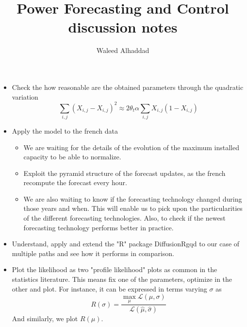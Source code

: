 \documentclass[a4paper, 12pt]{article}
\title{Power Forecasting and Control\\ discussion notes}
\author{Waleed Alhaddad }
\date{}
\begin{document}
\maketitle

\begin{itemize}
\item Check the how reasonable are the obtained parameters through the quadratic variation
\begin{equation}
\sum_{i,j} (X_{i,j} - X_{i,j})^2 \approx 2 \theta_t \alpha \sum_{i,j}  X_{i,j} (1-X_{i,j})
\end{equation}
\item Apply the model to the french data
	\begin{itemize}
	\item We are waiting for the details of the evolution of the maximum installed capacity to be able to normalize.
	\item Exploit the pyramid structure of the forecast updates, as the french 	recompute the forecast every hour.
	\item We are also waiting to know if the forecasting technology changed during those years and when. This will enable us to  pick upon the particularities of the different forecasting technologies. Also, to check if the newest forecasting technology performs better in practice.
	\end{itemize}
\item Understand, apply and extend the "R" package DiffusionRgqd to our case of multiple paths and see how it performs in comparison.
\item Plot the likelihood as two "profile likelihood" plots as common in the statistics literature. This means fix one of the parameters, optimize in the other and plot. For instance, it  can be expressed in terms varying $\sigma$ as
\begin{equation}
R(\sigma) = \frac{\max_\mu \mathcal{L}(\mu, \sigma)}{\mathcal{L}(\hat{\mu}, \hat{\sigma})}
\end{equation}
And similarly, we plot $R(\mu)$.


\end{itemize}
\end{document}
